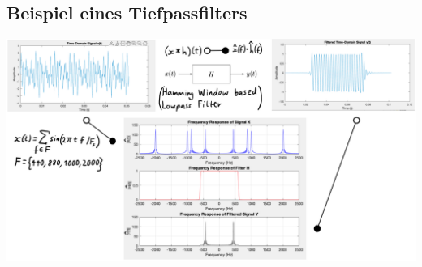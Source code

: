 \documentclass[11pt]{article}
\begin{document}
\subsection*{Beispiel eines Tiefpassfilters}
\vspace*{-0.5cm}
\begin{center}
    \includegraphics[width=0.9\linewidth]{docimgs/Hamming_lp.jpg}
\end{center}

\pagebreak
\end{document}
